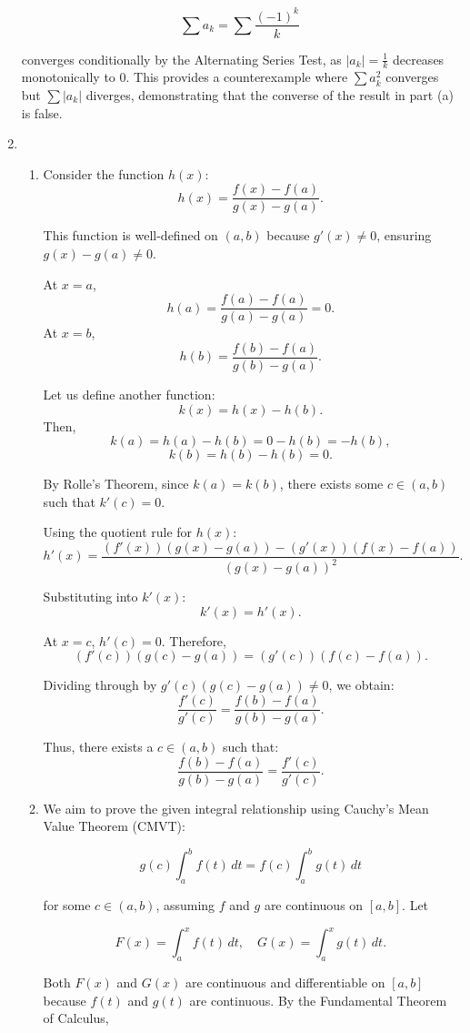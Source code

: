 \documentclass[12pt]{article}
\begin{document}
\begin{enumerate}
\[
\sum a_k = \sum \frac{(-1)^k}{k}
\]

converges conditionally by the Alternating Series Test, as \(|a_k| = \frac{1}{k}\) decreases monotonically to 0. This provides a counterexample where \(\sum a_k^2\) converges but \(\sum |a_k|\) diverges, demonstrating that the converse of the result in part (a) is false.

\item 
\begin{enumerate}
    \item 
    Consider the function $h(x)$:
    \[
h(x) = \frac{f(x) - f(a)}{g(x) - g(a)}.
\]

This function is well-defined on \((a, b)\) because \(g'(x) \neq 0\), ensuring \(g(x) - g(a) \neq 0\).

At \(x = a\),
\[
h(a) = \frac{f(a) - f(a)}{g(a) - g(a)} = 0.
\]
At \(x = b\),
\[
h(b) = \frac{f(b) - f(a)}{g(b) - g(a)}.
\]

Let us define another function:
\[
k(x) = h(x) - h(b).
\]
Then,
\[
k(a) = h(a) - h(b) = 0 - h(b) = -h(b),
\]
\[
k(b) = h(b) - h(b) = 0.
\]

By Rolle's Theorem, since \(k(a) = k(b)\), there exists some \(c \in (a, b)\) such that \(k'(c) = 0\).

Using the quotient rule for \(h(x)\):
\[
h'(x) = \frac{(f'(x))(g(x) - g(a)) - (g'(x))(f(x) - f(a))}{(g(x) - g(a))^2}.
\]

Substituting into \(k'(x)\):
\[
k'(x) = h'(x).
\]

At \(x = c\), \(h'(c) = 0\). Therefore,
\[
(f'(c))(g(c) - g(a)) = (g'(c))(f(c) - f(a)).
\]

Dividing through by \(g'(c)(g(c) - g(a)) \neq 0\), we obtain:
\[
\frac{f'(c)}{g'(c)} = \frac{f(b) - f(a)}{g(b) - g(a)}.
\]

Thus, there exists a \(c \in (a, b)\) such that:
\[
\frac{f(b) - f(a)}{g(b) - g(a)} = \frac{f'(c)}{g'(c)}.
\]

\item 
We aim to prove the given integral relationship using Cauchy's Mean Value Theorem (CMVT):

\[
g(c) \int_a^b f(t) \, dt = f(c) \int_a^b g(t) \, dt
\]

for some \( c \in (a, b) \), assuming \( f \) and \( g \) are continuous on \([a, b]\). Let

\[
F(x) = \int_a^x f(t) \, dt, \quad G(x) = \int_a^x g(t) \, dt.
\]

Both \( F(x) \) and \( G(x) \) are continuous and differentiable on \([a, b]\) because \( f(t) \) and \( g(t) \) are continuous. By the Fundamental Theorem of Calculus,


\end{enumerate}
\end{enumerate}
\end{document}
